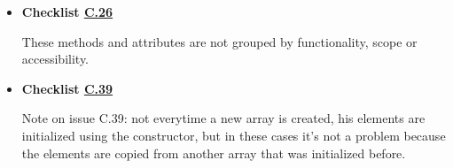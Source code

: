 \documentclass[../../../../codeInspection.tex]{subfiles}
\begin{document}
\begin{itemize}
		    \item \textbf{Checklist \hyperref[C:26]{C.26}}

		    	  

		    	  These methods and attributes are not grouped by functionality, scope or accessibility.

		    \item \textbf{Checklist \hyperref[C:39]{C.39}}

		    	  Note on issue C.39: not everytime a new array is created, his elements are initialized using the constructor, but in these cases it's not a problem because the elements are copied from another array that was initialized before.

		\end{itemize}
\end{document}
